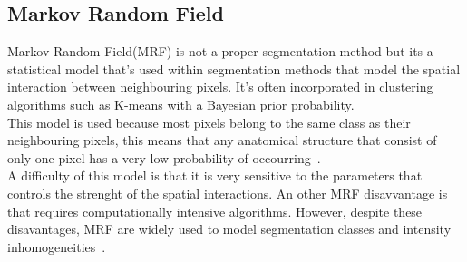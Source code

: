 \documentclass{standalone}
\begin{document}
	
	\subsection{Markov Random Field}
	
		Markov Random Field(MRF) is not a proper segmentation method but its a statistical model that's used within segmentation methods that model the spatial interaction between neighbouring pixels. It's often incorporated in clustering algorithms such as K-means with a Bayesian prior probability.\\
		This model is used because most pixels belong to the same class as their neighbouring pixels, this means that any anatomical structure that consist of only one pixel has a very low probability of occourring~\cite{ART:Pham}.\\
		A difficulty of this model is that it is very sensitive to the parameters that controls the strenght of the spatial interactions. An other MRF disavvantage is that requires computationally intensive algorithms. However, despite these disavantages, MRF are widely used to model segmentation classes and intensity inhomogeneities~\cite{ART:Pham}. 
		 
\end{document}
